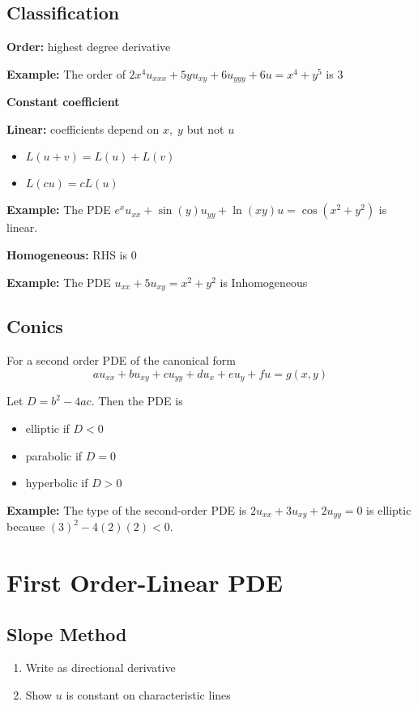 \documentclass[10pt]{article}
\begin{document}
\subsection{Classification}
\textbf{Order:} highest degree derivative 

\textbf{Example:} The order of $2x^4 u_{xxx} + 5yu_{xy} + 6u_{yyy} + 6u = x^4 + y^5$ is 3

\textbf{Constant coefficient}

\textbf{Linear:} coefficients depend on $x,\; y$ but not $u$
\begin{itemize}
    \item $L(u + v) = L(u) + L(v)$
    \item $L(cu) = cL(u)$
\end{itemize}

\textbf{Example:} The PDE $e^xu_{xx}+\sin(y)u_{yy} + \ln(xy)u = \cos(x^2 + y^2)$ is linear. 

\textbf{Homogeneous:} RHS is 0

\textbf{Example:} The PDE $u_{xx} + 5u_{xy} = x^2 + y^2$ is Inhomogeneous

\subsection{Conics}
For a second order PDE of the canonical form
\[au_{xx} + bu_{xy} + cu_{yy} + du_x + eu_y + fu = g(x, y)\]

Let $D = b^2 - 4ac$. Then the PDE is 
\begin{itemize}
    \item elliptic if $D < 0$
    \item parabolic if $D = 0$
    \item hyperbolic if $D > 0$
\end{itemize}

\textbf{Example:} The type of the second-order PDE is $2u_{xx} + 3u_{xy} + 2u_{yy} = 0$ is elliptic because $(3)^2 - 4(2)(2) < 0$. 
\section{First Order-Linear PDE}
\subsection{Slope Method}
\begin{enumerate}
    \item Write as directional derivative
    \item Show $u$ is constant on characteristic lines 
\end{enumerate}
\end{document}
